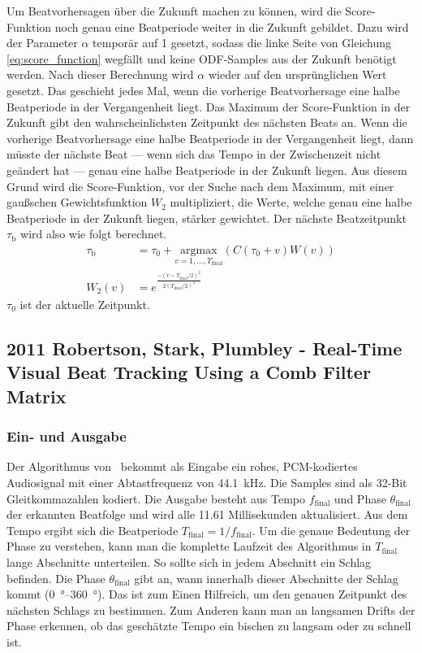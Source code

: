 {{{			%
			Um Beatvorhersagen über die Zukunft machen zu können,
				wird die Score-Funktion noch genau eine Beatperiode weiter in die Zukunft gebildet.
			Dazu wird der Parameter $\alpha$ temporär auf \num{1} gesetzt,
				sodass die linke Seite von Gleichung \eqref{eq:score_function} wegfällt
				und keine ODF-Samples aus der Zukunft benötigt werden.
			Nach dieser Berechnung wird $\alpha$ wieder auf den ursprünglichen Wert gesetzt.
			Das geschieht jedes Mal,
				wenn die vorherige Beatvorhersage eine halbe Beatperiode in der Vergangenheit liegt.
			Das Maximum der Score-Funktion in der Zukunft gibt den wahrscheinlichsten Zeitpunkt des nächsten Beats an.
			Wenn die vorherige Beatvorhersage eine halbe Beatperiode in der Vergangenheit liegt,
				dann müsste der nächste Beat
				--- wenn sich das Tempo in der Zwischenzeit nicht geändert hat ---
				genau eine halbe Beatperiode in der Zukunft liegen.
			Aus diesem Grund wird die Score-Funktion,
				vor der Suche nach dem Maximum,
				mit einer gau{\ss}schen Gewichtsfunktion $W_2$ multipliziert,
				die Werte, welche genau eine halbe Beatperiode in der Zukunft liegen,
				stärker gewichtet.
			Der nächste Beatzeitpunkt $\tau_\text{b}$ wird also wie folgt berechnet.
			\begin{align}
				\tau_\text{b} &= \tau_0 + \underset{v = 1, ..., \Upsilon_\text{final}}{\text{argmax}}(C(\tau_0 + v)W(v)) \\
				W_2(v) &= e^{\frac{-(v - \Upsilon_\text{final} / 2)^2}{2(\Upsilon_\text{final} / 2)^2}}
			\end{align}
			$\tau_0$ ist der aktuelle Zeitpunkt.
		}
	}

	\subsection{2011 Robertson, Stark, Plumbley - Real-Time Visual Beat Tracking Using a Comb Filter Matrix}
	{
		\subsubsection*{Ein- und Ausgabe}
		{
			Der Algorithmus von~\cite{2011_PlRoSt} bekommt als Eingabe ein rohes, PCM-kodiertes Audiosignal mit einer Abtastfrequenz von \SI{44.1}{\kilo\hertz}.
			Die Samples sind als 32-Bit Gleitkommazahlen kodiert.
			Die Ausgabe besteht aus Tempo $f_\text{final}$ und Phase $\theta_\text{final}$ der erkannten Beatfolge
				und wird alle \num{11.61} Millisekunden aktualisiert.
			Aus dem Tempo ergibt sich die Beatperiode $T_\text{final} = 1 / f_\text{final}$.
			Um die genaue Bedeutung der Phase zu verstehen,
				kann man die komplette Laufzeit des Algorithmus in $T_\text{final}$ lange Abschnitte unterteilen.
			So sollte sich in jedem Abschnitt ein Schlag befinden.
			Die Phase $\theta_\text{final}$ gibt an,
				wann innerhalb dieser Abschnitte der Schlag kommt (\SIrange{0}{360}{\degree}).
			Das ist zum Einen Hilfreich,
				um den genauen Zeitpunkt des nächsten Schlags zu bestimmen.
			Zum Anderen kann man an langsamen Drifts der Phase erkennen,
				ob das geschätzte Tempo ein bischen zu langsam oder zu schnell ist.
		}

}}
